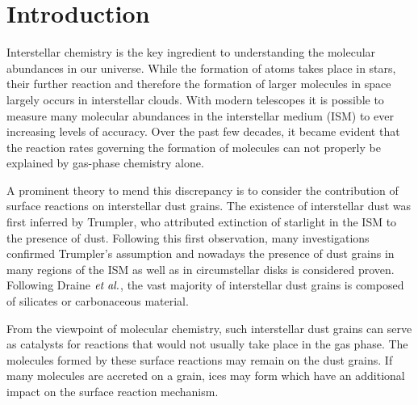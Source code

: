 \cleardoublepage


\tableofcontents
\cleardoublepage



    \maketitle
\section{Introduction}
\label{Sec:Intro}
Interstellar chemistry is the key ingredient to understanding the
molecular abundances in our universe. While
the formation of atoms takes place in stars, %
their further reaction and therefore the formation of larger molecules in
space largely occurs in interstellar clouds. With modern telescopes it is
possible to measure many molecular abundances in the interstellar medium (ISM)
to ever increasing levels of accuracy. Over the past few decades, it became
evident that the reaction rates governing the formation of molecules can not
properly be explained by gas-phase chemistry
alone.\cite{DishoeckHerbstNeufeld2013}

A prominent theory to mend this discrepancy is to consider the
contribution of surface reactions on interstellar dust
grains.\cite{WilliamsHerbst2002} The existence of interstellar dust was first
inferred by Trumpler,\cite{Trumpler1930} who attributed extinction of starlight
in the ISM to the presence of dust. Following this first observation, many
investigations confirmed Trumpler's assumption and nowadays the presence of
dust grains in many regions of the ISM as well as in circumstellar disks is
considered proven.
\cite{Zook2001,WestphalStroudBechtelEtAl2014} Following Draine $\emph{et al.}$,
the vast majority of interstellar dust grains is composed of silicates or
carbonaceous material. \cite{Draine2003}

From the viewpoint of molecular chemistry, such interstellar dust grains can
serve as catalysts for reactions that would not usually take place in the
gas phase. The molecules formed by these surface reactions may remain on the
dust grains. If many molecules are accreted on a grain, ices may form which have
an additional impact on the surface reaction mechanism.


